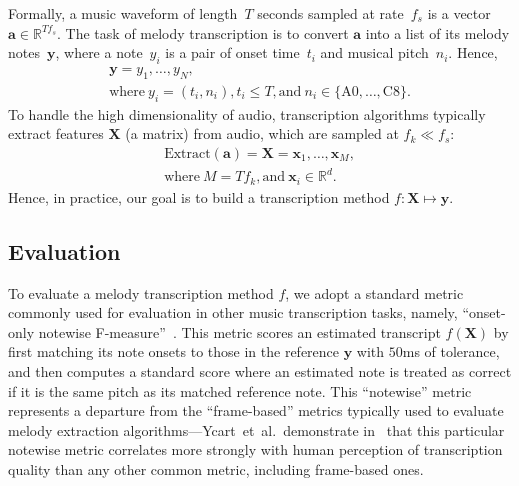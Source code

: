 Formally, a music waveform of length~$T$ seconds sampled at rate~$f_s$ is a vector~${\bm{a} \in \mathbb{R}^{Tf_s}}$. 
The task of melody transcription is to convert $\bm{a}$ into a list of its melody notes~$\bm{y}$, 
where a note~$y_i$ is a pair of onset time~$t_i$ and musical pitch~$n_i$. 
Hence, 
\begin{gather*}
    \bm{y} = y_1, \ldots, y_N, \\
    \text{where}~y_i = (t_i, n_i), t_i \leq T, \text{and}~n_i \in \{\text{A0}, \ldots, \text{C8}\}.
\end{gather*}
To handle the high dimensionality of audio, transcription algorithms typically extract features $\bm{X}$ (a matrix) from audio, which are sampled at ${f_k \ll f_s}$:
\begin{gather*}
    \text{Extract}(\bm{a}) = \bm{X} = \bm{x}_1, \ldots, \bm{x}_M, \\ 
    \text{where}~M = Tf_k, \text{and}~\bm{x}_i \in \mathbb{R}^d.
\end{gather*}
Hence, in practice, our goal is to build a transcription method 
${f : \bm{X} \mapsto \bm{y}}$.

\subsection{Evaluation}
\label{sec:eval}


To evaluate a melody transcription method $f$, 
we adopt a standard metric commonly used for evaluation in other music transcription tasks, namely,  ``onset-only notewise F-measure''~\cite{ycart2020investigating}. 
This metric scores an estimated transcript $f(\bm{X})$ by first matching its note onsets to those in the reference $\bm{y}$ with $50$ms of tolerance, and then computes a standard \fone{} score where an estimated note is treated as correct if it is the same pitch as its matched reference note. 
This ``notewise'' metric represents a departure from the ``frame-based'' metrics typically used to evaluate melody extraction algorithms---Ycart~et~al.\ demonstrate in~\cite{ycart2020investigating} that this particular notewise metric correlates more strongly with human perception of transcription quality than any other common metric, including frame-based ones.

